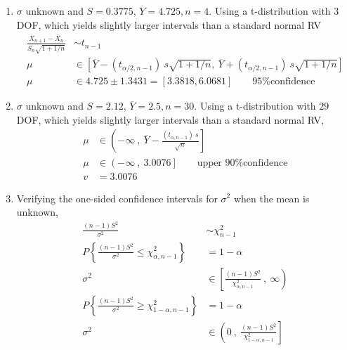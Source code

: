 \begin{enumerate}
	\item $ \sigma $ unknown and $ S = 0.3775 $, $ \overline{Y} = 4.725, n = 4$. Using a t-distribution with $ 3 $ DOF, which yields slightly larger intervals than a standard normal RV\\
	\begin{subequations}
		\begin{align}
			\frac{X_{n+1} - \overline{X}_n}{S_n \sqrt{1 + 1/n}} &\sim t_{n-1} \nonumber \\
			\mu &\in \left[ \overline{Y} - (t_{\alpha/2, n-1})\ s \sqrt{1 + 1/n}, \ \overline{Y} + (t_{\alpha/2, n-1})\ s \sqrt{1 + 1/n} \right] \nonumber \\
			\mu &\in 4.725 \pm 1.3431 = [3.3818, 6.0681] \qquad \text{95\% confidence} 
		\end{align}
	\end{subequations}
	
	\item  $ \sigma $ unknown and $ S = 2.12 $, $ \overline{Y} = 2.5, n = 30$. Using a t-distribution with $ 29 $ DOF, which yields slightly larger intervals than a standard normal RV,
	\begin{subequations}
		\begin{align}
			\mu &\in \left(-\infty\ ,\  \overline{Y} - \frac{(t_{\alpha, n-1})\ s}{\sqrt{n}} \right] \nonumber \\
			\mu &\in \left(-\infty\ ,\ 3.0076  \right] \qquad \text{upper 90\% confidence} \nonumber \\
			v &= 3.0076
		\end{align}
	\end{subequations}
	
	\item  Verifying the one-sided confidence intervals for $ \sigma^2 $ when the mean is unknown,
	\begin{subequations}
		\begin{align}
			\frac{(n-1)S^2}{\sigma^2} &\sim \chi^2_{n-1} \nonumber \\
			P \left\{ \frac{(n-1)S^2}{\sigma^2} \leq \chi^2_{\alpha, n-1} \right\} &= 1 - \alpha \nonumber \\
			\sigma^2 &\in \left[ \frac{(n-1)S^2}{\chi^2_{\alpha, n-1}}\ ,\ \infty \right) \\
			P \left\{ \frac{(n-1)S^2}{\sigma^2} \geq \chi^2_{1 - \alpha, n-1} \right\} &= 1 - \alpha \nonumber \\
			\sigma^2 &\in \left(0\ ,\ \frac{(n-1)S^2}{\chi^2_{1-\alpha, n-1}} \right]
		\end{align}
	\end{subequations}


\end{enumerate}
